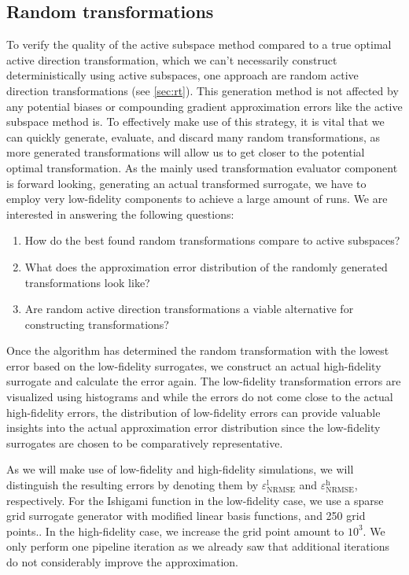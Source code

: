 \documentclass[
  a4paper,  %
  twoside,  %
  bibliography=totoc,
  headsepline,
  cleardoublepage=empty,
  parskip=half,
  draft=false
]{scrbook}
\begin{document}
\subsection{Random transformations}

To verify the quality of the active subspace method compared to a true optimal active direction transformation, which we can't necessarily construct deterministically using active subspaces, one approach are random active direction transformations (see \cref{sec:rt}).
This generation method is not affected by any potential biases or compounding gradient approximation errors like the active subspace method is.
To effectively make use of this strategy, it is vital that we can quickly generate, evaluate, and discard many random transformations, as more generated transformations will allow us to get closer to the potential optimal transformation.
As the mainly used transformation evaluator component is forward looking, \ie generating an actual transformed surrogate, we have to employ very low-fidelity components to achieve a large amount of runs.
We are interested in answering the following questions:
\begin{enumerate}
\item How do the best found random transformations compare to active subspaces?
\item What does the approximation error distribution of the randomly generated transformations look like?
\item Are random active direction transformations a viable alternative for constructing transformations?
\end{enumerate}
%
Once the algorithm has determined the random transformation with the lowest error based on the low-fidelity surrogates, we construct an actual high-fidelity surrogate and calculate the error again.
The low-fidelity transformation errors are visualized using histograms and while the errors do not come close to the actual high-fidelity errors, the distribution of low-fidelity errors can provide valuable insights into the actual approximation error distribution since the low-fidelity surrogates are chosen to be comparatively representative.

As we will make use of low-fidelity and high-fidelity simulations, we will distinguish the resulting errors by denoting them by $\varepsilon^\mathrm{l}_{\mathrm{NRMSE}}$ and $\varepsilon^\mathrm{h}_{\mathrm{NRMSE}}$, respectively.
For the Ishigami function in the low-fidelity case, we use a sparse grid surrogate generator with modified linear basis functions, and 250 grid points..
In the high-fidelity case, we increase the grid point amount to $10^3$.
We only perform one pipeline iteration as we already saw that additional iterations do not considerably improve the approximation.
\end{document}
